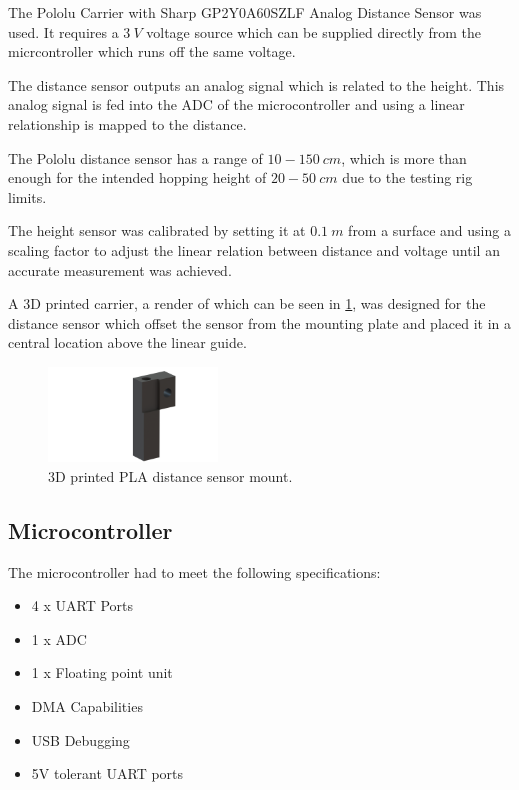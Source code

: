 The Pololu Carrier with Sharp GP2Y0A60SZLF Analog Distance Sensor was used. It requires a $3\ V$ voltage source which can be supplied directly from the micrcontroller which runs off the same voltage. 

The distance sensor outputs an analog signal which is related to the height. This analog signal is fed into the ADC of the microcontroller and using a linear relationship is mapped to the distance. 

The Pololu distance sensor has a range of $10-150\ cm$, which is more than enough for the intended hopping height of $20-50\ cm$ due to the testing rig limits.

The height sensor was calibrated by setting it at $0.1\ m$ from a surface and using a scaling factor to adjust the linear relation between distance and voltage until an accurate measurement was achieved. 

A 3D printed carrier, a render of which can be seen in \cref{fig:distance-sensor-mount}, was designed for the distance sensor which offset the sensor from the mounting plate and placed it in a central location above the linear guide.

\begin{figure}
\centering
\includegraphics[clip, trim=4cm 0cm 2cm 0cm, width=0.4\textwidth]{images/mechanical/distance-sensor-mount} 
\caption{3D printed PLA distance sensor mount.}
\label{fig:distance-sensor-mount}
\end{figure}

\subsection{Microcontroller}
The microcontroller had to meet the following specifications:
\begin{itemize}
\item 4 x UART Ports
\item 1 x ADC
\item 1 x Floating point unit
\item DMA Capabilities
\item USB Debugging
\item 5V tolerant UART ports
\end{itemize}

